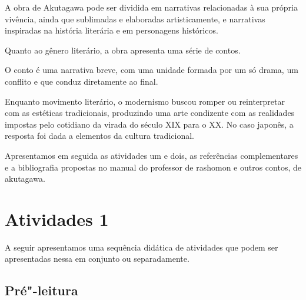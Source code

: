 \documentclass[12pt]{extarticle}
\begin{document}
A obra de Akutagawa pode ser dividida em narrativas relacionadas à sua própria
vivência, ainda que sublimadas e elaboradas artisticamente, e narrativas
inspiradas na história literária e em personagens históricos.
 
Quanto ao gênero literário, a obra apresenta uma série de contos.
 
O conto é uma narrativa breve, com uma unidade formada por um só drama, um
conflito e que conduz diretamente ao final.
 
Enquanto movimento literário, o modernismo buscou romper ou reinterpretar com
as estéticas tradicionais, produzindo uma arte condizente com as realidades
impostas pelo cotidiano da virada do século XIX para o XX.  No caso japonês, a
resposta foi dada a elementos da cultura tradicional.


Apresentamos em seguida as atividades um e dois, as referências complementares
e a bibliografia propostas no manual do professor de rashomon e outros contos,
de akutagawa.

\section{Atividades 1}

A seguir apresentamos uma sequência didática de atividades que podem ser
apresentadas nessa em conjunto ou separadamente. 

\subsection{Pré"-leitura}
\end{document}
